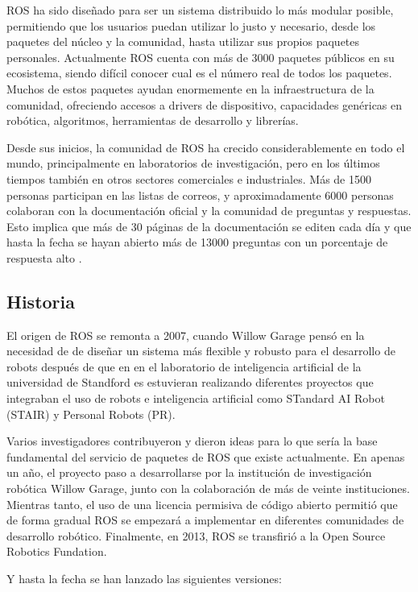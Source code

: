 ROS ha sido diseñado para ser un sistema distribuido lo más modular posible,
permitiendo que los usuarios puedan utilizar lo justo y necesario, desde los
paquetes del núcleo y la comunidad, hasta utilizar sus propios paquetes
personales. Actualmente ROS cuenta con más de 3000 paquetes públicos en su
ecosistema, siendo difícil conocer cual es el número real de todos los paquetes.
Muchos de estos paquetes ayudan enormemente en la infraestructura de la
comunidad, ofreciendo accesos a drivers de dispositivo, capacidades genéricas en
robótica, algoritmos, herramientas de desarrollo y librerías.

Desde sus inicios, la comunidad de ROS ha crecido considerablemente en todo el
mundo, principalmente en laboratorios de investigación, pero en los últimos
tiempos también en otros sectores comerciales e industriales. Más de 1500
personas participan en las listas de correos, y aproximadamente 6000 personas
colaboran con la documentación oficial y la comunidad de preguntas y respuestas.
Esto implica que más de 30 páginas de la documentación se editen cada día y que
hasta la fecha se hayan abierto más de 13000 preguntas con un porcentaje de
respuesta alto \cite{ROSIsforme}.

\subsection{Historia}
El origen de ROS se remonta a 2007, cuando Willow Garage pensó en la necesidad
de de diseñar un sistema más flexible y robusto para el desarrollo de robots
después de que en en el laboratorio de inteligencia artificial de la universidad
de Standford es estuvieran realizando diferentes proyectos que integraban el uso
de robots e inteligencia artificial como STandard AI Robot (STAIR) y Personal
Robots (PR).

Varios investigadores contribuyeron y dieron ideas para lo que sería la base
fundamental del servicio de paquetes de ROS que existe actualmente. En apenas un
año, el proyecto paso a desarrollarse por la institución de investigación
robótica Willow Garage, junto con la colaboración de más de veinte
instituciones. Mientras tanto, el uso de una licencia permisiva de código
abierto permitió que de forma gradual ROS se empezará a implementar en
diferentes comunidades de desarrollo robótico. Finalmente, en 2013, ROS se
transfirió a la Open Source Robotics Fundation.

Y hasta la fecha se han lanzado las siguientes versiones:

